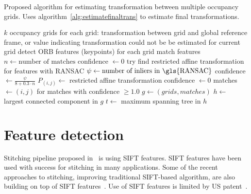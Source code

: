 \begin{algorithm}
    \caption{Proposed algorithm for estimating transformation between multiple occupancy grids. Uses algorithm~\ref{alg:estimatefinaltrans} to estimate final transformations.}
    \label{alg:estimategridtrasform}
    \begin{algorithmic}[1]
        \Require $k$ occupancy grids
        \Ensure for each grid: transformation between grid and global reference frame, or value indicating transformation could not be be estimated for current grid
            \State detect \gls{ORB} features (keypoints) for each grid
             
            	\State match features
            	\State $n \gets \text{number of matches}$
            		\State confidence $\gets 0$
            	\Else
            		\State try find restricted affine transformation for features with \gls{RANSAC}
            		\State $\psi \gets \text{number of inliers in \gls{RANSAC}}$
            			\State confidence $\gets \frac{\psi}{8 + 0.3 \cdot n}$
                        \State $P_{(i,j)} \gets$ restricted affine transformation
            		\Else
            			\State confidence $\gets 0$
            		\EndIf
            	\EndIf
            \EndFor
            \State matches $\gets (i,j)$ for matches with confidence $\ge 1.0$
            \State $g \gets (grids, matches)$
            \State $h \gets$ largest connected component in $g$
            \State $t \gets$ maximum spanning tree in $h$
            \State {} 
        \EndProcedure
    \end{algorithmic}
\end{algorithm}


\section{Feature detection} %
\label{sec:featuredetection}

Stitching pipeline proposed in~\cite{Brown2006} is using \gls{SIFT} features. \gls{SIFT} features have been used with success for stitching in many applications. Some of the recent approaches to stitching, improving traditional \gls{SIFT}-based algorithm, are also building on top of \gls{SIFT} features~\cite{Xie2015}. Use of \gls{SIFT} features is limited by US patent~\cite{lowe2004method}.

